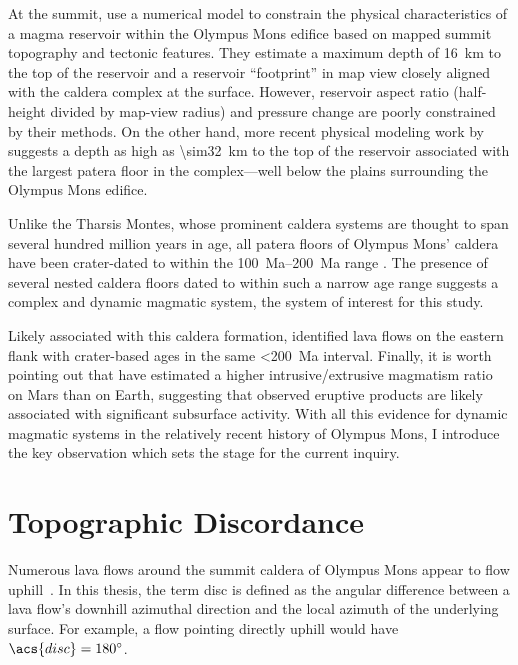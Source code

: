 At the summit, \textcite{zuber_caldera_1992} use a numerical model to constrain the physical characteristics of a magma reservoir within the Olympus Mons edifice based on mapped summit topography and tectonic features. They estimate a maximum depth of \qty{16}{km} to the top of the reservoir and a reservoir ``footprint'' in map view closely aligned with the caldera complex at the surface. However, reservoir aspect ratio (half-height divided by map-view radius) and pressure change are poorly constrained by their methods. On the other hand, more recent physical modeling work by \textcite{beddingfield_formation_2011} suggests a depth as high as \qty{\sim32}{km} to the top of the reservoir associated with the largest patera floor in the complex---well below the plains surrounding the Olympus Mons edifice.

Unlike the Tharsis Montes, whose prominent caldera systems are thought to span several hundred million years in age, all patera floors of Olympus Mons' caldera have been crater-dated to within the \qtyrange{100}{200}{Ma} range \parencite{neukum_recent_2004}. The presence of several nested caldera floors dated to within such a narrow age range suggests a complex and dynamic magmatic system, the system of interest for this study.

Likely associated with this caldera formation, \textcite{basilevsky_geologically_2006} identified lava flows on the eastern flank with crater-based ages in the same \qty{<200}{Ma} interval. Finally, it is worth pointing out that \textcite[][and others]{black_eruptibility_2016} have estimated a higher intrusive/extrusive magmatism ratio on Mars than on Earth, suggesting that observed eruptive products are likely associated with significant subsurface activity. With all this evidence for dynamic magmatic systems in the relatively recent history of Olympus Mons, I introduce the key observation which sets the stage for the current inquiry.  

\section{Topographic Discordance}\label{sec:discordance}

Numerous lava flows around the summit caldera of Olympus Mons appear to flow uphill~\parencite[Figure~\ref{fig:uphill-flows}; after][]{mouginis-mark_late-stage_2019}. In this thesis, the term \ac{disc} is defined as the angular difference between a lava flow's downhill azimuthal direction and the local azimuth of the underlying surface. For example, a flow pointing directly uphill would have $\acs{disc}=\ang{180}$. 


